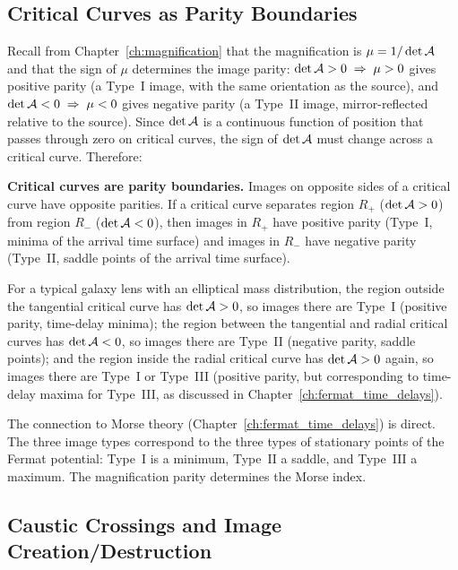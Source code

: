 \subsection{Critical Curves as Parity Boundaries}
\label{sec:parity_boundaries}

Recall from Chapter~\ref{ch:magnification} that the magnification is
$\mu = 1/\det\mathcal{A}$ and that the sign of $\mu$ determines the image
parity: $\det\mathcal{A} > 0 \;\Rightarrow\; \mu > 0$ gives positive
parity (a Type~I image, with the same orientation as the source),
and $\det\mathcal{A} < 0 \;\Rightarrow\; \mu < 0$ gives negative parity (a
Type~II image, mirror-reflected relative to the source).  Since
$\det\mathcal{A}$ is a continuous function of position that passes through
zero on critical curves, the sign of $\det\mathcal{A}$ must change across
a critical curve.  Therefore:

\begin{proposition}
\textbf{Critical curves are parity boundaries.}  Images on opposite
sides of a critical curve have opposite parities.  If a critical
curve separates region $R_+$ ($\det\mathcal{A} > 0$) from region $R_-$
($\det\mathcal{A} < 0$), then images in $R_+$ have positive parity
(Type~I, minima of the arrival time surface) and images in $R_-$
have negative parity (Type~II, saddle points of the arrival time
surface).
\end{proposition}

For a typical galaxy lens with an elliptical mass distribution, the
region outside the tangential critical curve has $\det\mathcal{A} > 0$, so
images there are Type~I (positive parity, time-delay minima); the
region between the tangential and radial critical curves has
$\det\mathcal{A} < 0$, so images there are Type~II (negative parity,
saddle points); and the region inside the radial critical curve has
$\det\mathcal{A} > 0$ again, so images there are Type~I or Type~III
(positive parity, but corresponding to time-delay maxima for
Type~III, as discussed in Chapter~\ref{ch:fermat_time_delays}).

\begin{remark}
The connection to Morse theory (Chapter~\ref{ch:fermat_time_delays})
is direct.  The three image types correspond to the three types of
stationary points of the Fermat potential: Type~I is a minimum,
Type~II a saddle, and Type~III a maximum.  The magnification parity
determines the Morse index.
\end{remark}


\subsection{Caustic Crossings and Image Creation/Destruction}
\label{sec:caustic_crossings}

